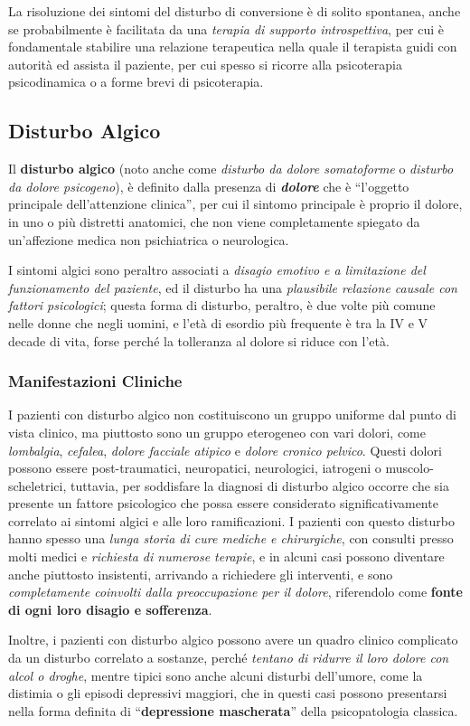 La risoluzione dei sintomi del disturbo di conversione è di solito
spontanea, anche se probabilmente è facilitata da una \emph{terapia di
supporto introspettiva}, per cui è fondamentale stabilire una relazione
terapeutica nella quale il terapista guidi con autorità ed assista il
paziente, per cui spesso si ricorre alla psicoterapia psicodinamica o a
forme brevi di psicoterapia.

\subsection{Disturbo Algico}

Il \textbf{disturbo algico} (noto anche come \emph{disturbo da dolore
somatoforme} o \emph{disturbo da dolore psicogeno}), è definito dalla
presenza di \textbf{\emph{dolore}} che è ``l'oggetto principale
dell'attenzione clinica'', per cui il sintomo principale è proprio il
dolore, in uno o più distretti anatomici, che non viene completamente
spiegato da un'affezione medica non psichiatrica o neurologica.

I sintomi algici sono peraltro associati a \emph{disagio emotivo e a
limitazione del funzionamento del paziente}, ed il disturbo ha una
\emph{plausibile relazione causale con fattori psicologici}; questa
forma di disturbo, peraltro, è due volte più comune nelle donne che
negli uomini, e l'età di esordio più frequente è tra la IV e V decade di
vita, forse perché la tolleranza al dolore si riduce con l'età.

\subsubsection{Manifestazioni Cliniche}

I pazienti con disturbo algico non costituiscono un gruppo uniforme dal
punto di vista clinico, ma piuttosto sono un gruppo eterogeneo con vari
dolori, come \emph{lombalgia}, \emph{cefalea}, \emph{dolore facciale
atipico} e \emph{dolore} \emph{cronico pelvico}. Questi dolori possono
essere post-traumatici, neuropatici, neurologici, iatrogeni o
muscolo-scheletrici, tuttavia, per soddisfare la diagnosi di disturbo
algico occorre che sia presente un fattore psicologico che possa essere
considerato significativamente correlato ai sintomi algici e alle loro
ramificazioni. I pazienti con questo disturbo hanno spesso una
\emph{lunga storia di cure mediche e chirurgiche}, con consulti presso
molti medici e \emph{richiesta di numerose terapie}, e in alcuni casi
possono diventare anche piuttosto insistenti, arrivando a richiedere gli
interventi, e sono \emph{completamente coinvolti dalla preoccupazione
per il dolore}, riferendolo come \textbf{fonte di ogni loro disagio e
sofferenza}.

Inoltre, i pazienti con disturbo algico possono avere un quadro clinico
complicato da un disturbo correlato a sostanze, perché \emph{tentano di
ridurre il loro dolore con alcol o droghe}, mentre tipici sono anche
alcuni disturbi dell'umore, come la distimia o gli episodi depressivi
maggiori, che in questi casi possono presentarsi nella forma definita di
``\textbf{depressione mascherata}'' della psicopatologia classica.
